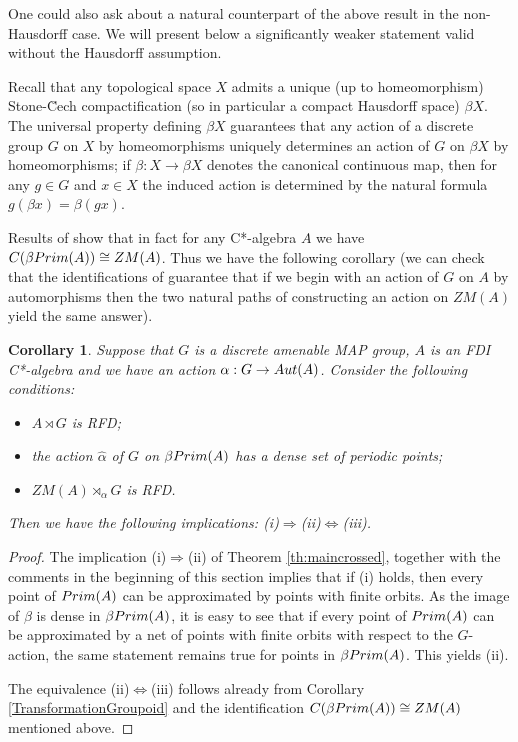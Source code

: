 \documentclass[11 pt, leqno, hidelinks]{amsart}%
\theoremstyle{plain}
\newtheorem{corollary}[theorem]{Corollary}
\numberwithin{equation}{section}
\newcommand{\Prim}{\textup{Prim}}
\begin{document}
One could also ask about a natural counterpart of the above result in the non-Hausdorff case. We will present below a significantly weaker statement valid without the Hausdorff assumption.

Recall that any topological space $X$ admits a unique (up to homeomorphism) Stone-\u{C}ech compactification (so in particular a compact Hausdorff space) $\beta X$. The universal property defining $\beta X$ guarantees that any action of a discrete group $G$ on $X$ by homeomorphisms uniquely determines an action of $G$ on $\beta X$ by homeomorphisms; if $\beta: X \to \beta X$ denotes the canonical continuous map, then for any $g \in G$ and $x \in X$ the induced action is determined by the natural formula $g (\beta x) = \beta (gx)$.

Results of \cite{Nilsen} show that in fact for any C*-algebra $A$ we have $C(\beta \Prim(A)) \cong ZM(A)$. Thus we have the following corollary (we can check that the identifications of \cite{Nilsen} guarantee that if we begin with an  action of $G$ on $A$ by automorphisms then the two natural paths of constructing an action on $ZM(A)$ yield the same answer).


\begin{corollary} \label{cor:commnH}
	Suppose that $G$ is a discrete amenable MAP group, $A$ is an FDI C*-algebra and we have an action $\alpha: G \to \textup{Aut}(A)$. Consider the following conditions:
	\begin{itemize}
		\item[(i)] $A \rtimes G$ is RFD;
		\item[(ii)] the action $\hat{\alpha}$ of $G$ on $\beta\Prim(A)$ has a dense set of periodic points;
		\item[(iii)] $ZM(A)\rtimes_{\alpha} G$ is RFD.
	\end{itemize}	
	Then we have the following implications: (i)$\Longrightarrow$(ii)$\Longleftrightarrow$(iii).
\end{corollary}
\begin{proof}
	The implication (i)$\Longrightarrow$(ii) of Theorem \ref{th:maincrossed}, together with the comments in the beginning of this section implies that if (i) holds, then every point of $\Prim(A)$ can be approximated by points with finite orbits.
	As the image of $\beta$ is dense in $\beta \Prim(A)$, it is easy to see that if every point of $\Prim(A)$ can be approximated by a net of points with finite orbits with respect to the $G$-action, the same statement remains true for points in $\beta\Prim(A)$. This yields (ii).
	
	The equivalence (ii)$\Longleftrightarrow$(iii) follows already from Corollary \ref{TransformationGroupoid} and the identification $C(\beta \Prim(A)) \cong ZM(A)$ mentioned above.
\end{proof}
\end{document}
